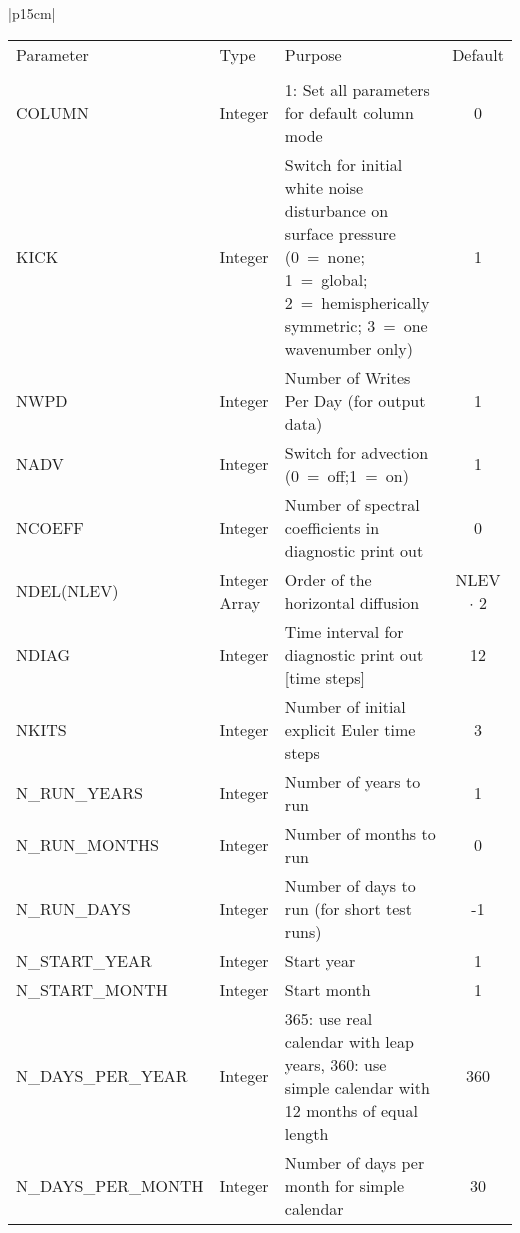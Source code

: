 \begin{center}
\begin{tabular}{|p{15cm}|}
\begin{center}
\begin{tabular}{l l p{5cm} c}  %
Parameter & Type & Purpose & Default \\
&&&\\
COLUMN & Integer   & 1: Set all parameters for default column mode & 0 \\
KICK & Integer & Switch for initial white noise disturbance on surface pressure (0~=~none;
1~=~global; 2~=~hemispherically symmetric; 3~=~one wavenumber only) & 1 \\
NWPD & Integer & Number of Writes Per Day (for output data) & 1 \\
NADV   & Integer & Switch for advection (0~=~off;1~=~on)    &  1 \\
NCOEFF & Integer &Number of spectral coefficients in diagnostic print out & 0 \\
NDEL(NLEV)  & Integer Array & Order of the horizontal diffusion & NLEV $\cdot$ 2 \\
NDIAG & Integer & Time interval for diagnostic print out [time steps] & 12\\
NKITS & Integer & Number of initial explicit Euler time steps & 3 \\
N\_RUN\_YEARS & Integer & Number of years to run & 1 \\
N\_RUN\_MONTHS & Integer & Number of months to run & 0 \\
N\_RUN\_DAYS & Integer & Number of days to run (for short test runs) & -1 \\
N\_START\_YEAR & Integer & Start year & 1 \\
N\_START\_MONTH & Integer & Start month & 1 \\
N\_DAYS\_PER\_YEAR & Integer & 365: use real calendar with leap years,
360: use simple calendar with 12 months of equal length & 360 \\
N\_DAYS\_PER\_MONTH & Integer & Number of days per month for simple calendar
 & 30 \\
\end{tabular}
\end{center}
\vspace{3mm} \\
\hline
\end{tabular}
\end{center}

\newpage 

